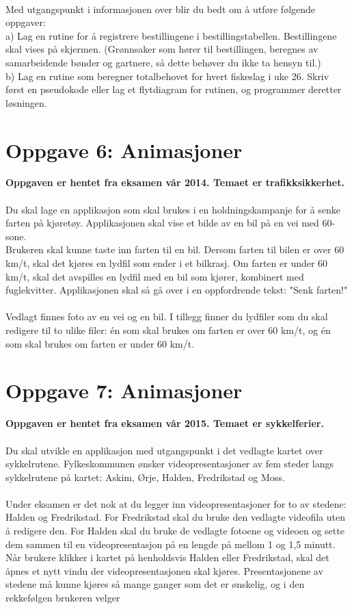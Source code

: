 \documentclass[a4paper, norsk, 10pt]{article}
\begin{document}
 \ \\
 \clearpage
\noindent Med utgangspunkt i informasjonen over blir du bedt om å utføre følgende oppgaver:\\
a) Lag en rutine for å registrere bestillingene i bestillingstabellen. Bestillingene skal vises på skjermen. (Grønnsaker som hører til bestillingen, beregnes av samarbeidende bønder og gartnere, så dette behøver du ikke ta hensyn til.)\\
b) Lag en rutine som beregner totalbehovet for hvert fiskeslag i uke 26. Skriv først en pseudokode eller lag et flytdiagram for rutinen, og programmer deretter løsningen.\\

\section*{Oppgave 6: Animasjoner}
\textbf{Oppgaven er hentet fra eksamen vår 2014. Temaet er trafikksikkerhet.}\\
\ \\
Du skal lage en applikasjon som skal brukes i en holdningskampanje for å senke farten på kjøretøy. Applikasjonen skal vise et bilde av en bil på en vei med 60-sone.\\ Brukeren skal kunne taste inn farten til en bil. Dersom farten til bilen er over 60 km/t, skal det kjøres en lydfil som ender i et bilkrasj. Om farten er under 60 km/t, skal det avspilles en lydfil med en bil som kjører, kombinert med fuglekvitter. Applikasjonen skal så gå over i en oppfordrende tekst: "Senk farten!"\\
\ \\
Vedlagt finnes foto av en vei og en bil. I tillegg finner du lydfiler som du skal redigere til to ulike filer: én som skal brukes om farten er over 60 km/t, og én som skal brukes om farten er under 60 km/t.\\

\section*{Oppgave 7: Animasjoner}
\textbf{Oppgaven er hentet fra eksamen vår 2015. Temaet er sykkelferier.}\\
\ \\
Du skal utvikle en applikasjon med utgangspunkt i det vedlagte kartet over sykkelrutene. Fylkeskommunen ønsker videopresentasjoner av fem steder langs sykkelrutene på kartet: Askim, Ørje, Halden, Fredrikstad og Moss.\\
\ \\
Under eksamen er det nok at du legger inn videopresentasjoner for to av stedene: Halden og Fredrikstad. For Fredrikstad skal du bruke den vedlagte videofila uten å redigere den. For Halden skal du bruke de vedlagte fotoene og videoen og sette dem sammen til en videopresentasjon på en lengde på mellom 1 og 1,5 minutt.\\
Når brukere klikker i kartet på henholdsvis Halden eller Fredrikstad, skal det åpnes et nytt vindu der videopresentasjonen skal kjøres. Presentasjonene av stedene må kunne kjøres så mange ganger som det er ønskelig, og i den rekkefølgen brukeren velger\\
\end{document}
